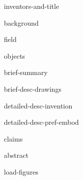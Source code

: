 \documentclass[english]{patentex}
\begin{document}
{inventors-and-title}

\maketitle


{background}

{field}

{objects}

{brief-summary}

{brief-desc-drawings}

{detailed-desc-invention}

{detailed-desc-pref-embod}

{claims}

{abstract}

{load-figures}
\end{document}
